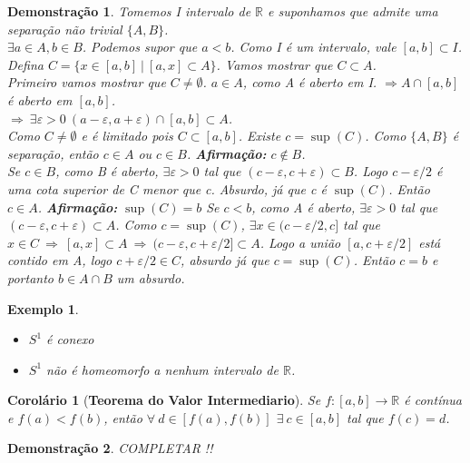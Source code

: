 \documentclass{article}
\newtheorem{corolario}{Corolário}
\newtheorem*{exemplo}{Exemplo}
\newtheorem*{prova}{Demonstração}
\newcommand{\R}{\mathbb{R}}
\newcommand{\eps}{\varepsilon}
\begin{document}
\begin{prova}
    Tomemos I intervalo de $\R$ e suponhamos que admite uma separação não trivial $\{A, B\}$.\\
    $\exists a \in A, b \in B$.
    Podemos supor que $a < b$. 
    Como I é um intervalo, vale $[a, b] \subset I$.
    Defina $C = \{x \in [a, b] \: | \: [a, x] \subset A\}$. 
    Vamos mostrar que $C \subset A$.\\
    Primeiro vamos mostrar que $C \neq \emptyset$. $a \in A$, como A é aberto em I.
    $\Rightarrow A \cap [a,b]$ é aberto em $[a,b]$.\\
    $\Rightarrow \: \exists \eps > 0 \: (a-\eps, a+\eps) \cap [a, b] \subset A$.\\
    Como $C \neq \emptyset$ e é limitado pois $C \subset [a,b]$. Existe $c = \sup(C)$.
    Como $\{A, B\}$ é separação, então $c \in A$ ou $c \in B$.
    \textbf{Afirmação:} $c \notin B$.\\
    Se $c \in B$, como B é aberto, $\exists \eps > 0$ tal que $(c-\eps, c+\eps) \subset B$.
    Logo $c-\eps/2$ é uma cota superior de C menor que c. Absurdo, já que c é $\sup(C)$. Então $c \in A$.
    \textbf{Afirmação:} $\sup(C) = b$
    Se $c < b$, como A é aberto, $\exists \eps > 0$ tal que $(c-\eps, c+\eps) \subset A$.
    Como $c = \sup(C)$, $\exists x \in (c-\eps/2, c]$ tal que\\
    $x \in C \: \Rightarrow \: [a,x] \subset A \: \Rightarrow \: (c-\eps, c + \eps/2] \subset A$.
    Logo a união $[a, c+\eps/2]$ está contido em A, logo $c+\eps/2 \in C$, absurdo já que $c = \sup(C)$.
    Então $c = b$ e portanto $b \in A \cap B$ um absurdo. 
\end{prova}

\begin{exemplo}
    \
    \begin{itemize}
        \item $S^1$ é conexo
        \item $S^1$ não é homeomorfo a nenhum intervalo de $\R$.
    \end{itemize}
\end{exemplo}

\begin{corolario}[\textbf{Teorema do Valor Intermediario}]
    Se $f: [a, b] \rightarrow \R$ é contínua e $f(a) < f(b)$, então $\forall \: d \in [f(a), f(b)]$ $\exists \: c \in [a, b]$ tal que $f(c) = d$. 
\end{corolario}

\begin{prova}
    COMPLETAR !!
\end{prova}
\end{document}
